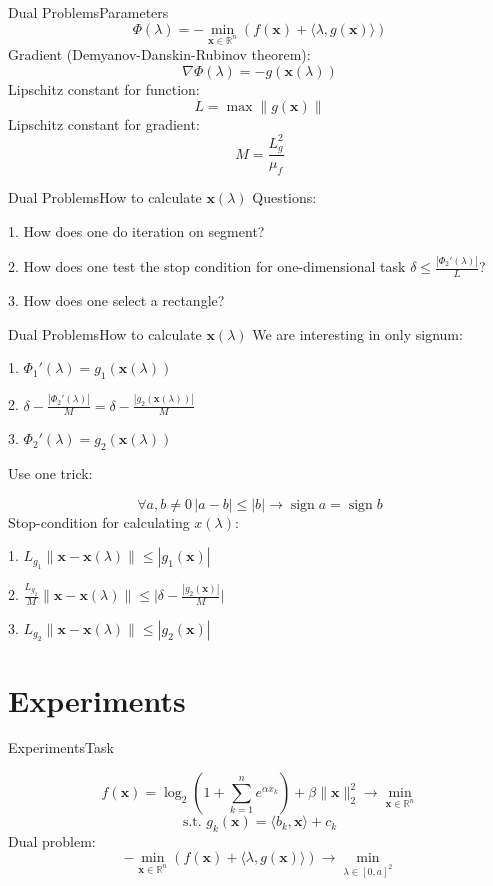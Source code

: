 \documentclass{beamer}
\DeclareMathOperator{\sign}{sign}
\begin{document}
\begin{frame}{Dual Problems}{Parameters}
$$\Phi(\lambda) = -\min\limits_{\textbf{x}\in \mathbb{R}^n}\left(f(\textbf{x}) + \langle\lambda, g(\textbf{x})\rangle\right)$$
Gradient (Demyanov-Danskin-Rubinov theorem):
$$\nabla \Phi(\lambda) = -g(\textbf{x}(\lambda))$$
Lipschitz constant for function:
$$L = \max\|g(\textbf{x})\|$$
Lipschitz constant for gradient:
$$M = \frac{L_g^2}{\mu_f}$$
\end{frame}

\begin{frame}{Dual Problems}{How to calculate $\textbf{x}(\lambda)$}
Questions:

1. How does one do iteration on segment?

2. How does one test the stop condition for one-dimensional task $\delta \leq \frac{|\Phi_2'(\lambda)|}{L}$?

3. How does one select a rectangle?
\end{frame}

\begin{frame}{Dual Problems}{How to calculate $\textbf{x}(\lambda)$}
We are interesting in only signum:

1. $\Phi_1'(\lambda) = g_1\left(\textbf{x}(\lambda)\right)$

2. $\delta -  \frac{|\Phi_2'(\lambda)|}{M} = \delta -  \frac{|g_2\left(\textbf{x}(\lambda)\right)|}{M} $

3. $\Phi_2'(\lambda) = g_2\left(\textbf{x}(\lambda)\right)$
\pause

Use one trick:

$$\forall a, b\neq 0\,|a-b|\leq|b|\rightarrow \sign a = \sign b$$
\pause
Stop-condition for calculating $x(\lambda)$:

1. $L_{g_1}\|\textbf{x}-\textbf{x}(\lambda)\| \leq |g_1(\textbf{x})|$

2. $\frac{L_{g_2}}{M}\|\textbf{x}-\textbf{x}(\lambda)\|\leq \Big|\delta-\frac{|g_2\left(\textbf{x}\right)|}{M}\Big|$

3. $L_{g_2}\|\textbf{x}-\textbf{x}(\lambda)\| \leq |g_2(\textbf{x})|$
\end{frame}

\section{Experiments}

\begin{frame}{Experiments}{Task}

$$f(\textbf{x}) = \log_2\left(1+\sum_{k=1}^ne^{\alpha x_k}\right) + \beta\|\textbf{x}\|^2_2 \rightarrow \min_{\textbf{x}\in\mathbb{R}^n}$$
$$\text{s.t. }g_k(\textbf{x}) = \langle b_k, \textbf{x}\rangle + c_k$$
Dual problem:
$$-\min\limits_{\textbf{x}\in \mathbb{R}^n}\left(f(\textbf{x}) + \langle\lambda, g(\textbf{x})\rangle\right) \rightarrow \min_{\lambda \in [0,a]^2}$$
\end{frame}
\end{document}
